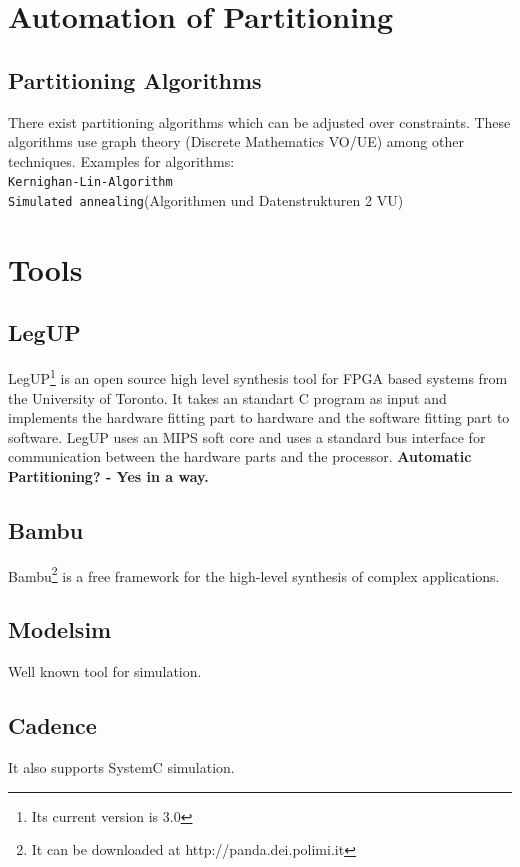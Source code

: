 \documentclass{article}
\begin{document}
	\section{Automation of Partitioning}
	  
	  \subsection{Partitioning Algorithms}
	    There exist partitioning algorithms which can be adjusted over constraints.
	    These algorithms use graph theory (Discrete Mathematics VO/UE) among other techniques.
	    Examples for algorithms: \\
	     \texttt{Kernighan-Lin-Algorithm}\\
	     \texttt{Simulated annealing}(Algorithmen und Datenstrukturen 2 VU)
	  
	\section{Tools}	  
	  \subsection{LegUP}
	  LegUP\footnote{Its current version is 3.0} is an open source high level synthesis tool for FPGA based systems from the University of Toronto. 
	  It takes an standart C program as input and implements the hardware fitting part to hardware and the software fitting part to software.
	  LegUP uses an MIPS soft core and uses a standard bus interface for communication between the hardware parts and the processor.  
	  \textbf{Automatic Partitioning? - Yes in a way.}
	  
	  
	  \subsection{Bambu}
	  Bambu\footnote{It can be downloaded at http://panda.dei.polimi.it} is a free framework for the high-level synthesis of complex applications.
	  
	  \subsection{Modelsim}
	  Well known tool for simulation.
	  
	  \subsection{Cadence}
	  It also supports SystemC simulation.
\end{document}
